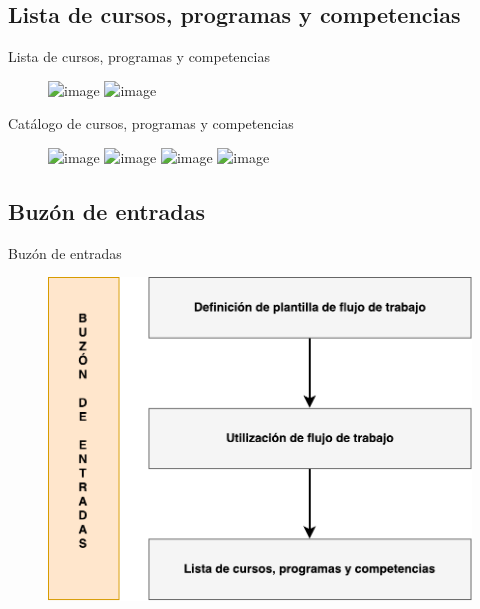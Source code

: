 \documentclass[10pt,xcolor=table ]{beamer}
\begin{document}
\subsection{Lista de cursos, programas y competencias}
\begin{frame}{Lista de cursos, programas y competencias}
\begin{figure}
		\centering
	    \includegraphics<1>[scale=0.55]{../Figuras/Pantallas/funcionalidades_3}
	    \includegraphics<2>[scale=0.55]{../Figuras/Pantallas/funcionalidades_4}
	\end{figure}
\end{frame}

\begin{frame}{Catálogo de cursos, programas y competencias}
	\begin{figure}
		\centering
		\includegraphics<1>[scale=0.3]{../Figuras/Pantallas/curriculum_list_1}
		\includegraphics<2>[scale=0.3]{../Figuras/Pantallas/curriculum_list_2}
		\includegraphics<3>[scale=0.25]{../Figuras/Pantallas/curriculum_list_3}
		\includegraphics<4>[scale=0.3]{../Figuras/Pantallas/curriculum_list_4}
	\end{figure}
\end{frame}


\subsection{Buzón de entradas}
\begin{frame}{Buzón de entradas}
\begin{figure}
		\centering
	    \includegraphics[scale=0.55]{../Figuras/Pantallas/funcionalidades_1}
	\end{figure}
\end{frame}
\end{document}
